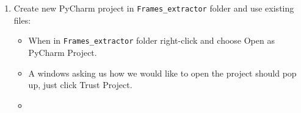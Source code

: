 \documentclass[a4paper,12pt]{article}
\begin{document}
\begin{enumerate}
	\linebreak	
	\item Create new PyCharm project in \verb|Frames_extractor| folder and use existing files:
		\begin{itemize}
			\item \begin{minipage}[t]{\linewidth}
				\raggedright
				\medskip	
			\end{minipage}
			When in \verb|Frames_extractor| folder right-click and choose Open as PyCharm Project.
			\item \begin{minipage}[t]{\linewidth}
				\raggedright
				\medskip	
			\end{minipage}
			A windows asking us how we would like to open the project should pop up, just click Trust Project.
			\item \begin{minipage}[t]{\linewidth}
				\raggedright
\end{minipage}
\end{itemize}
\end{enumerate}
\end{document}
